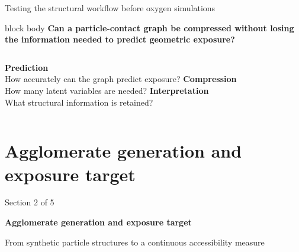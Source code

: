 \documentclass[aspectratio=169,11pt]{beamer}
\newcommand{\hi}[1]{\textcolor{tumblue}{\textbf{#1}}}
\newcommand{\question}[1]{%
  \begin{beamercolorbox}[rounded=true,sep=0.7em]{block body}
    \centering\large\color{tumdark}\textbf{#1}
  \end{beamercolorbox}}
\begin{document}
\begin{frame}{Testing the structural workflow before oxygen simulations}
  \question{Can a particle-contact graph be compressed without losing the information needed to predict geometric exposure?}
  \vspace{.45cm}
  \centering
  \vspace{.65cm}
  \begin{columns}[T,onlytextwidth]
    \centering
      \hi{Prediction}\\\small How accurately can the graph predict exposure?
    \centering
      \hi{Compression}\\\small How many latent variables are needed?
    \centering
      \hi{Interpretation}\\\small What structural information is retained?
  \end{columns}
\end{frame}

\section[Exposure target]{Agglomerate generation and exposure target}
\begin{frame}{}
  \vfill
  {\large\color{tumgray}Section 2 of 5}\par\vspace{0.4cm}
  {\LARGE\color{tumblue}\textbf{Agglomerate generation and exposure target}}\par\vspace{0.5cm}
  {\large From synthetic particle structures to a continuous accessibility measure}
  \vfill
\end{frame}
\end{document}

